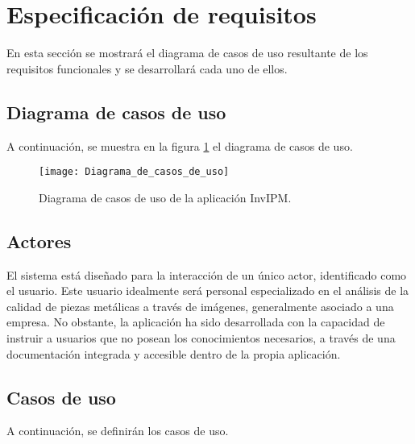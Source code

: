 \section{Especificación de requisitos}\label{especificación-de-requisitos}

En esta sección se mostrará el diagrama de casos de uso resultante de los requisitos funcionales y se desarrollará cada uno de ellos.

\subsection{Diagrama de casos de uso}\label{diagrama-de-casos-de-uso}

A continuación, se muestra en la figura \ref{fig:Diagrama_de_casos_de_uso} el diagrama de casos de uso.

\begin{figure}[!h]
    \centering
    \texttt{[image: Diagrama\_de\_casos\_de\_uso]}
    \caption{Diagrama de casos de uso de la aplicación InvIPM.}\label{fig:Diagrama_de_casos_de_uso}
\end{figure}

\newpage

\subsection{Actores}\label{actores}

El sistema está diseñado para la interacción de un único actor, identificado como el usuario. Este usuario idealmente será personal especializado en el análisis de la calidad de piezas metálicas a través de imágenes, generalmente asociado a una empresa. No obstante, la aplicación ha sido desarrollada con la capacidad de instruir a usuarios que no posean los conocimientos necesarios, a través de una documentación integrada y accesible dentro de la propia aplicación.

\subsection{Casos de uso}\label{casos-de-uso}

A continuación, se definirán los casos de uso.

